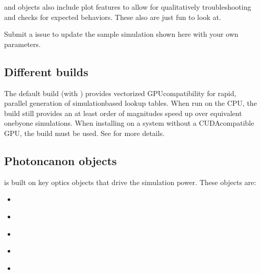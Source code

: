 \documentclass[letterpaper,10pt,english]{sphinxmanual}
\begin{document}
\sphinxAtStartPar
{} and  objects also include plot features to allow for qualitatively troubleshooting and checks for
expected behaviors. These also are just fun to look at.

\sphinxAtStartPar
{}

\sphinxAtStartPar
{} Submit a 
issue to update the sample simulation shown here with your own parameters.


\subsection{Different builds}
\label{\detokenize{README:different-builds}}
\sphinxAtStartPar
The default build (with ) provides vectorized GPU\sphinxhyphen{}compatibility for rapid, parallel generation of simulation\sphinxhyphen{}based
lookup tables. When run on the CPU, the  build still provides an at least order of magnitudes speed up over
equivalent one\sphinxhyphen{}by\sphinxhyphen{}one simulations. When installing on a system without a CUDA\sphinxhyphen{}compatible GPU, the  build must be
used. See {\hyperref[\detokenize{README:install-with-pip}]{}} for more details.


\subsection{Photon\sphinxhyphen{}canon objects}
\label{\detokenize{README:photon-canon-objects}}
\sphinxAtStartPar
{} is built on key optics objects that drive the simulation power. These objects are:
\begin{itemize}
\item {} 
\sphinxAtStartPar
{\hyperref[\detokenize{generated/photon_canon.optics:photon_canon.optics.Illumination.photon}]{}}

\item {} 
\sphinxAtStartPar
{\hyperref[\detokenize{generated/photon_canon.optics:photon_canon.optics.Photon.medium}]{}}

\item {} 
\sphinxAtStartPar
{\hyperref[\detokenize{README:system}]{}}

\item {} 
\sphinxAtStartPar
{\hyperref[\detokenize{README:illuminator}]{}}

\item {} 
\sphinxAtStartPar
{\hyperref[\detokenize{README:detector}]{}}

\end{itemize}
\end{document}
